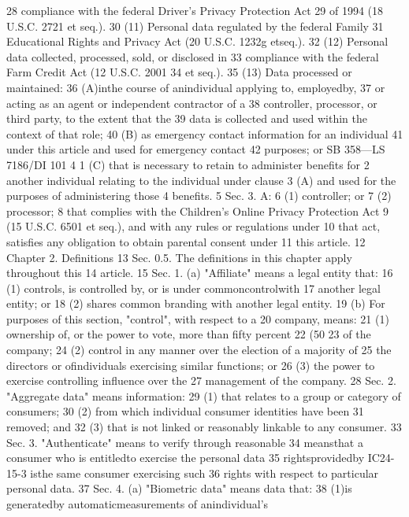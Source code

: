 28 compliance with the federal Driver's Privacy Protection Act
29 of 1994 (18 U.S.C. 2721 et seq.).
30 (11) Personal data regulated by the federal Family
31 Educational Rights and Privacy Act (20 U.S.C. 1232g etseq.).
32 (12) Personal data collected, processed, sold, or disclosed in
33 compliance with the federal Farm Credit Act (12 U.S.C. 2001
34 et seq.).
35 (13) Data processed or maintained:
36 (A)inthe course of anindividual applying to, employedby,
37 or acting as an agent or independent contractor of a
38 controller, processor, or third party, to the extent that the
39 data is collected and used within the context of that role;
40 (B) as emergency contact information for an individual
41 under this article and used for emergency contact
42 purposes; or
SB 358—LS 7186/DI 101
4
1 (C) that is necessary to retain to administer benefits for
2 another individual relating to the individual under clause
3 (A) and used for the purposes of administering those
4 benefits.
5 Sec. 3. A:
6 (1) controller; or
7 (2) processor;
8 that complies with the Children's Online Privacy Protection Act
9 (15 U.S.C. 6501 et seq.), and with any rules or regulations under
10 that act, satisfies any obligation to obtain parental consent under
11 this article.
12 Chapter 2. Definitions
13 Sec. 0.5. The definitions in this chapter apply throughout this
14 article.
15 Sec. 1. (a) "Affiliate" means a legal entity that:
16 (1) controls, is controlled by, or is under commoncontrolwith
17 another legal entity; or
18 (2) shares common branding with another legal entity.
19 (b) For purposes of this section, "control", with respect to a
20 company, means:
21 (1) ownership of, or the power to vote, more than fifty percent
22 (50%
23 of the company;
24 (2) control in any manner over the election of a majority of
25 the directors or ofindividuals exercising similar functions; or
26 (3) the power to exercise controlling influence over the
27 management of the company.
28 Sec. 2. "Aggregate data" means information:
29 (1) that relates to a group or category of consumers;
30 (2) from which individual consumer identities have been
31 removed; and
32 (3) that is not linked or reasonably linkable to any consumer.
33 Sec. 3. "Authenticate" means to verify through reasonable
34 meansthat a consumer who is entitledto exercise the personal data
35 rightsprovidedby IC24-15-3 isthe same consumer exercising such
36 rights with respect to particular personal data.
37 Sec. 4. (a) "Biometric data" means data that:
38 (1)is generatedby automaticmeasurements of anindividual's
